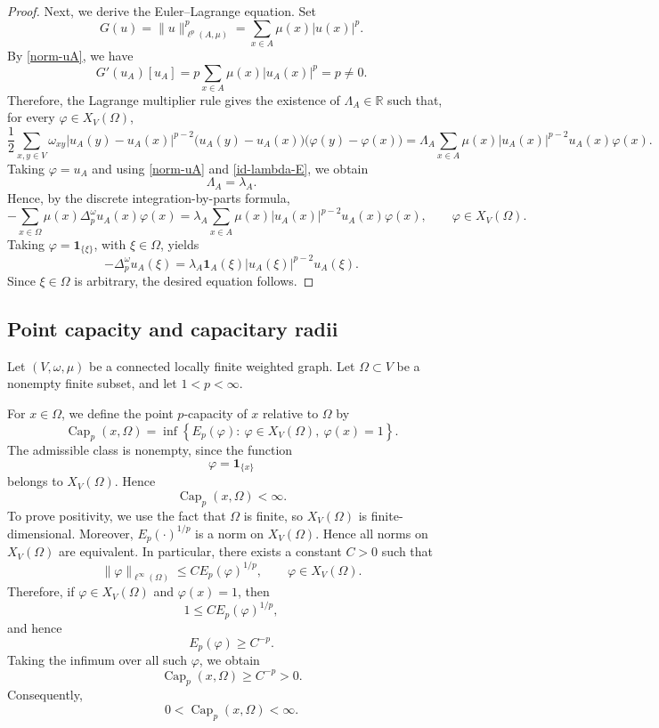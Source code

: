 \documentclass[twoside,12pt,letter]{article}
\theoremstyle{plain}
\theoremstyle{definition}
\theoremstyle{remark}
\numberwithin{equation}{section}
\begin{document}
\begin{proof}
Next, we derive the Euler--Lagrange equation. Set
\[
G(u)=\|u\|_{\ell^p(A,\mu)}^p
=
\sum_{x\in A}\mu(x)|u(x)|^p.
\]
By \eqref{norm-uA}, we have
\[
G'(u_A)[u_A]
=
p\sum_{x\in A}\mu(x)|u_A(x)|^p
=
p\neq 0.
\]
Therefore, the Lagrange multiplier rule gives the existence of
\(\Lambda_A\in\mathbb{R}\) such that, for every \(\varphi\in X_V(\Omega)\),
\[
\frac12
\sum_{x,y\in V}
\omega_{xy}
|u_A(y)-u_A(x)|^{p-2}
\bigl(u_A(y)-u_A(x)\bigr)
\bigl(\varphi(y)-\varphi(x)\bigr)
=
\Lambda_A
\sum_{x\in A}
\mu(x)|u_A(x)|^{p-2}u_A(x)\varphi(x).
\]
Taking \(\varphi=u_A\) and using \eqref{norm-uA} and \eqref{id-lambda-E}, we
obtain
\[
\Lambda_A=\lambda_A.
\]
Hence, by the discrete integration-by-parts formula,
\[
-\sum_{x\in\Omega}\mu(x)\Delta_p^\omega u_A(x)\varphi(x)
=
\lambda_A
\sum_{x\in A}\mu(x)|u_A(x)|^{p-2}u_A(x)\varphi(x),
\qquad
\varphi\in X_V(\Omega).
\]
Taking \(\varphi=\mathbf{1}_{\{\xi\}}\), with \(\xi\in\Omega\), yields
\[
-\Delta_p^\omega u_A(\xi)
=
\lambda_A\mathbf{1}_A(\xi)|u_A(\xi)|^{p-2}u_A(\xi).
\]
Since \(\xi\in\Omega\) is arbitrary, the desired equation follows.
\end{proof}

\subsection{Point capacity and capacitary radii}

Let \((V,\omega,\mu)\) be a connected locally finite weighted graph. Let
\(\Omega\subset V\) be a nonempty finite subset, and let \(1<p<\infty\).

For \(x\in\Omega\), we define the point \(p\)-capacity of \(x\)
relative to \(\Omega\) by
\[
\operatorname{Cap}_p(x,\Omega)
=
\inf\left\{
E_p(\varphi):\ \varphi\in X_V(\Omega),\ \varphi(x)=1
\right\}.
\]
The admissible class is nonempty, since the function
\[
\varphi=\mathbf{1}_{\{x\}}
\]
belongs to \(X_V(\Omega)\). Hence
\[
\operatorname{Cap}_p(x,\Omega)<\infty.
\]
To prove positivity, we use the fact that \(\Omega\) is finite, so
\(X_V(\Omega)\) is finite-dimensional. Moreover, \(E_p(\cdot)^{1/p}\) is a norm
on \(X_V(\Omega)\). Hence all norms on \(X_V(\Omega)\) are equivalent. In
particular, there exists a constant \(C>0\) such that
\[
\|\varphi\|_{\ell^\infty(\Omega)}
\le
C E_p(\varphi)^{1/p},
\qquad \varphi\in X_V(\Omega).
\]
Therefore, if \(\varphi\in X_V(\Omega)\) and \(\varphi(x)=1\), then
\[
1\le C E_p(\varphi)^{1/p},
\]
and hence
\[
E_p(\varphi)\ge C^{-p}.
\]
Taking the infimum over all such \(\varphi\), we obtain
\[
\operatorname{Cap}_p(x,\Omega)\ge C^{-p}>0.
\]
Consequently,
\[
0<\operatorname{Cap}_p(x,\Omega)<\infty.
\]
\end{document}
